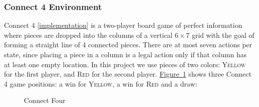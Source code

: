 \documentclass{article}
\newcommand{\GithubURL}[1]{[\href{https://github.com/davidrobles/mlnd-capstone-code/blob/master/#1}{implementation}]}
\begin{document}
\subsubsection{Connect 4 Environment}

Connect 4 \GithubURL{capstone/game/games/connect4.py} is a two-player board game of perfect
information where pieces are dropped into the columns of a vertical $6 \times 7$ grid with the goal
of forming a straight line of 4 connected pieces. There are at most seven actions per state, since
placing a piece in a column is a legal action only if that column has at least one empty location.
In this project we use pieces of two colors: \textsc{Yellow} for the first player, and \textsc{Red}
for the second player. \hyperref[fig:c4-env]{Figure~\ref*{fig:c4-env}} shows three Connect 4 game
positions: a win for \textsc{Yellow}, a win for \textsc{Red} and a draw:


\begin{figure}[!h]
    \centering
     \hspace{0.1in}
     \hspace{0.1in}
    \caption{Connect Four}
    \label{fig:c4-env}
\end{figure}
\end{document}
